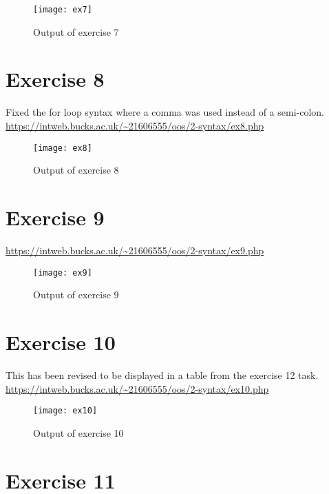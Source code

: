 \begin{figure}[H]
  \caption{Output of exercise 7}
  \centering
  \texttt{[image: ex7]}
\end{figure}

\clearpage
\section{Exercise 8}

Fixed the for loop syntax where a comma was used instead of a semi-colon.\\

\url{https://intweb.bucks.ac.uk/~21606555/oos/2-syntax/ex8.php}
\captionsetup{type=figure}


\begin{figure}[H]
  \caption{Output of exercise 8}
  \centering
  \texttt{[image: ex8]}
\end{figure}

\clearpage
\section{Exercise 9}

\url{https://intweb.bucks.ac.uk/~21606555/oos/2-syntax/ex9.php}
\captionsetup{type=figure}


\begin{figure}[H]
  \caption{Output of exercise 9}
  \centering
  \texttt{[image: ex9]}
\end{figure}

\clearpage
\section{Exercise 10}

This has been revised to be displayed in a table from the exercise 12 task.\\

\url{https://intweb.bucks.ac.uk/~21606555/oos/2-syntax/ex10.php}
\captionsetup{type=figure}


\begin{figure}[H]
  \caption{Output of exercise 10}
  \centering
  \texttt{[image: ex10]}
\end{figure}

\clearpage
\section{Exercise 11}

